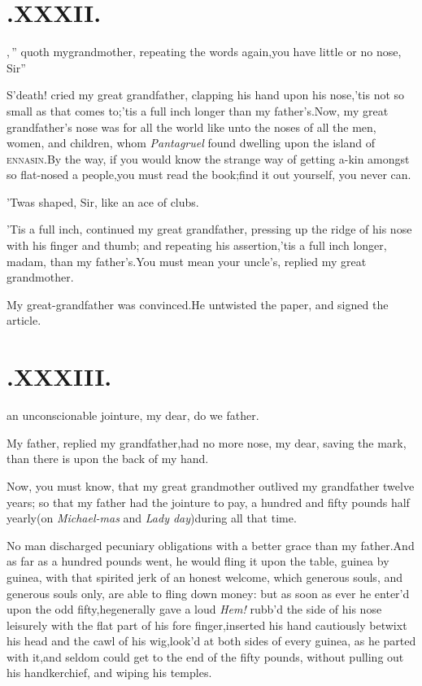 \documentclass{article}
\begin{document}
\section{.\quad  XXXII.}

,\,”
quoth my\break grandmother, repeating the\break
words again,\tsk\lqq you have little or no\break
\lqq nose, Sir”\tsh

S’death! cried my great grandfather, clapping his hand
upon his nose,\tsk ’tis not so small as that comes
to;\tsk ’tis a full inch longer than my
father’s.\tsk Now, my great grandfather’s nose was
for all
the world like unto the noses of all the men, women, and
children, whom \textit{Pantagruel} found dwelling upon the
island of \textsc{ennasin}.\tsh By the way, if you would know
the strange way of getting a-kin amongst so flat-nosed a
people,\tsk you must read the book;\tsk find it out yourself,
you never can.\tsh

\tsh ’Twas shaped, Sir, like an ace of clubs.

\tsh ’Tis a full inch, continued my great grandfather,
pressing up the ridge of his nose with his finger and thumb; and
repeating his assertion,\tsh ’tis a full inch longer,
madam, than my father’s\tsh.\break You must mean your
uncle’s, replied my great grandmother.

\tsh My great-grandfather was convinced.\tsk He
untwisted the paper, and signed the article.

\section{.\quad  XXXIII.}

 an unconscionable\break
jointure, my dear, do we
father.

My father, replied my grandfather,\break had no more nose, my dear,
saving the mark, than there is upon the back of my\break
hand.\tsh

\tsk Now, you must know, that my great grandmother outlived my
grandfather twelve years; so that my father
had the
jointure to pay, a hundred and fifty pounds half yearly\tsk (on
\textit{Michael-\break mas} and \textit{Lady day})\tsk during all
that\break
time.

No man discharged pecuniary obligations with a better grace than
my father.\tsh And as far as a hundred pounds went, he
would fling it upon the table, guinea by guinea, with that spirited
jerk of an honest welcome, which generous souls, and generous souls
only, are able to fling down money: but as soon as ever he
enter’d upon the odd fifty,\tsk he\break generally gave a loud
\textit{Hem!} rubb’d the side of his nose leisurely with the
flat part of his fore finger,\tsh inserted his hand
cautiously betwixt his head and the cawl of his
wig,\tsk look’d at both sides of every guinea, as he parted
with it,\tsk and seldom could get to the end of the fifty
pounds, without pulling out his handkerchief, and wiping his
temples.
\end{document}
